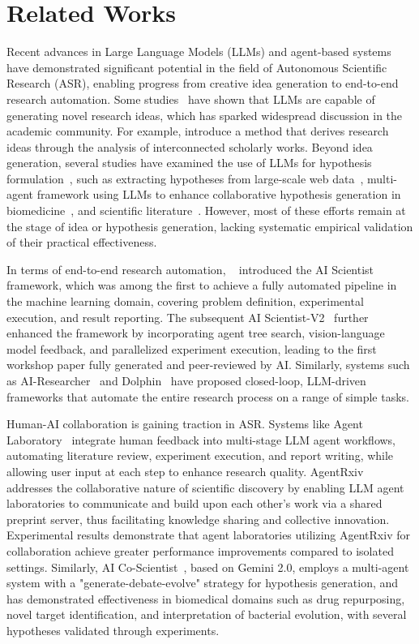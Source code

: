 \section{Related Works}

Recent advances in Large Language Models (LLMs) and agent-based systems have demonstrated significant potential in the field of Autonomous Scientific Research (ASR), enabling progress from creative idea generation to end-to-end research automation. Some studies~\citep{li2024chain, wang2023scimon, zhou2024hypothesis} have shown that LLMs are capable of generating novel research ideas, which has sparked widespread discussion in the academic community. For example, \citet{li2024chain} introduce a method that derives research ideas through the analysis of interconnected scholarly works. Beyond idea generation, several studies have examined the use of LLMs for hypothesis formulation~\citep{qi2023large, qi2024large}, such as extracting hypotheses from large-scale web data~\citep{yang2023large}, multi-agent framework using LLMs to enhance collaborative hypothesis generation in biomedicine~\citep{qi2023large, qi2024large}, and scientific literature~\citep{wang2023scimon, zhou2024hypothesis}. However, most of these efforts remain at the stage of idea or hypothesis generation, lacking systematic empirical validation of their practical effectiveness.

In terms of end-to-end research automation, ~\citet{lu2024ai} introduced the AI Scientist framework, which was among the first to achieve a fully automated pipeline in the machine learning domain, covering problem definition, experimental execution, and result reporting. The subsequent AI Scientist-V2~\citep{yamada2025ai} further enhanced the framework by incorporating agent tree search, vision-language model feedback, and parallelized experiment execution, leading to the first workshop paper fully generated and peer-reviewed by AI. Similarly, systems such as AI-Researcher~\citep{AiResearcher} and Dolphin~\citep{yuan2025dolphin} have proposed closed-loop, LLM-driven frameworks that automate the entire research process on a range of simple tasks.

Human-AI collaboration is gaining traction in ASR. Systems like Agent Laboratory~\citep{Agentlaboratory} integrate human feedback into multi-stage LLM agent workflows, automating literature review, experiment execution, and report writing, while allowing user input at each step to enhance research quality. AgentRxiv~\citep{Agentrxiv} addresses the collaborative nature of scientific discovery by enabling LLM agent laboratories to communicate and build upon each other's work via a shared preprint server, thus facilitating knowledge sharing and collective innovation. Experimental results demonstrate that agent laboratories utilizing AgentRxiv for collaboration achieve greater performance improvements compared to isolated settings. Similarly, AI Co-Scientist~\citep{gottweis2025towards}, based on Gemini 2.0, employs a multi-agent system with a "generate-debate-evolve" strategy for hypothesis generation, and has demonstrated effectiveness in biomedical domains such as drug repurposing, novel target identification, and interpretation of bacterial evolution, with several hypotheses validated through experiments.

